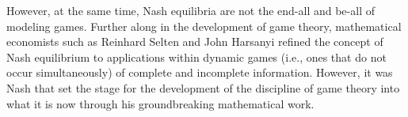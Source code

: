 \documentclass[12pt]{extarticle}
\begin{document}
  However, at the same time, Nash equilibria are not the end-all and be-all of modeling games. Further along in the development of game theory, mathematical economists such as Reinhard Selten and John Harsanyi refined the concept of Nash equilibrium to applications within dynamic games (i.e., ones that do not occur simultaneously) of complete and incomplete information.\supercite{nash_selten_harsanyi_nobel} However, it was Nash that set the stage for the development of the discipline of game theory into what it is now through his groundbreaking mathematical work.
  \printbibliography
\end{document}
